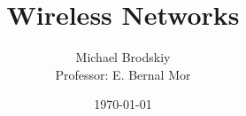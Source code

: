 


\title{Wireless Networks}
\date{\today}
\author{Michael Brodskiy\\ \small Professor: E. Bernal Mor}



\maketitle

